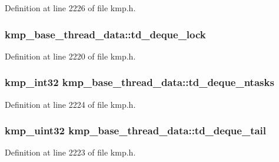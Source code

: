 Definition at line 2226 of file kmp.\-h.

\hypertarget{structkmp__base__thread__data_afa4a079da04b5b91f938163730476253}{
\subsubsection[{td\-\_\-deque\-\_\-lock}]{ kmp\-\_\-base\-\_\-thread\-\_\-data\-::td\-\_\-deque\-\_\-lock}}\label{structkmp__base__thread__data_afa4a079da04b5b91f938163730476253}


Definition at line 2220 of file kmp.\-h.

\hypertarget{structkmp__base__thread__data_a9db07e6f1d2e2ddff722b8d8ee110abd}{
\subsubsection[{td\-\_\-deque\-\_\-ntasks}]{\setlength{\rightskip}{0pt plus 5cm}kmp\-\_\-int32 kmp\-\_\-base\-\_\-thread\-\_\-data\-::td\-\_\-deque\-\_\-ntasks}}\label{structkmp__base__thread__data_a9db07e6f1d2e2ddff722b8d8ee110abd}


Definition at line 2224 of file kmp.\-h.

\hypertarget{structkmp__base__thread__data_a11c677b0d6ffa6e936cf0cce3c2536c3}{
\subsubsection[{td\-\_\-deque\-\_\-tail}]{\setlength{\rightskip}{0pt plus 5cm}kmp\-\_\-uint32 kmp\-\_\-base\-\_\-thread\-\_\-data\-::td\-\_\-deque\-\_\-tail}}\label{structkmp__base__thread__data_a11c677b0d6ffa6e936cf0cce3c2536c3}


Definition at line 2223 of file kmp.\-h.

